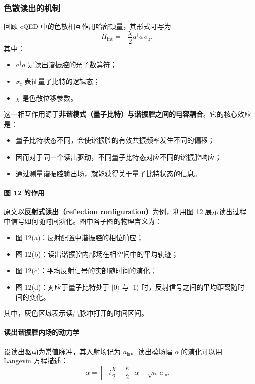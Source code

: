 \documentclass[12pt,a4paper,oneside]{ctexbook}
\begin{document}
\subsubsection{色散读出的机制}

回顾 cQED 中的色散相互作用哈密顿量，其形式可写为
\[
H_{\mathrm{int}}=-\frac{\chi}{2}a^\dagger a\,\sigma_z,
\]
其中：
\begin{itemize}
    \item \(a^\dagger a\) 是读出谐振腔的光子数算符；
    \item \(\sigma_z\) 表征量子比特的逻辑态；
    \item \(\chi\) 是色散位移参数。
\end{itemize}

这一相互作用源于\textbf{非谐模式（量子比特）与谐振腔之间的电容耦合}。它的核心效应是：
\begin{itemize}
    \item 量子比特状态不同，会使谐振腔的有效共振频率发生不同的偏移；
    \item 因而对于同一个读出驱动，不同量子比特态对应不同的谐振腔响应；
    \item 通过测量谐振腔输出场，就能获得关于量子比特状态的信息。
\end{itemize}

\paragraph{图 12 的作用}
原文以\textbf{反射式读出（reflection configuration）}为例，利用图 12 展示读出过程中信号如何随时间演化。图中各子图的物理含义为：
\begin{itemize}
    \item 图 12(a)：反射配置中谐振腔的相位响应；
    \item 图 12(b)：读出谐振腔内部场在相空间中的平均轨迹；
    \item 图 12(c)：平均反射信号的实部随时间的演化；
    \item 图 12(d)：对应于量子比特处于 \(|0\rangle\) 与 \(|1\rangle\) 时，反射信号之间的平均距离随时间的变化。
\end{itemize}

其中，灰色区域表示读出脉冲打开的时间区间。

\paragraph{读出谐振腔内场的动力学}
设读出驱动为常值脉冲，其入射场记为 \(a_{\mathrm{in}}\)。读出模场幅 \(\alpha\) 的演化可以用 Langevin 方程描述：
\[
\dot{\alpha}
=
\left[\pm i\frac{\chi}{2}-\frac{\kappa}{2}\right]\alpha
-\sqrt{\kappa}\,a_{\mathrm{in}}.
\]
\end{document}
